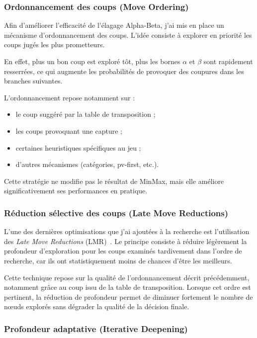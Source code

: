 \documentclass[11pt,a4paper]{article}
\begin{document}
\subsubsection{Ordonnancement des coups (Move Ordering)}

Afin d'améliorer l'efficacité de l'élagage Alpha-Beta, j'ai mis en place un mécanisme d'ordonnancement des coups. L'idée consiste
à explorer en priorité les coups jugés les plus prometteurs.

En effet, plus un bon coup est exploré tôt, plus les bornes $\alpha$ et $\beta$ sont rapidement resserrées, ce qui augmente
les probabilités de provoquer des coupures dans les branches suivantes.

L'ordonnancement repose notamment sur :

\begin{itemize}
  \item le coup suggéré par la table de transposition ;
  \item les coups provoquant une capture ;
  \item certaines heuristiques spécifiques au jeu ;
  \item d'autres mécanismes (catégories, pv-first, etc.).
\end{itemize}

Cette stratégie ne modifie pas le résultat de MinMax, mais elle améliore significativement ses performances en pratique.

\subsubsection{Réduction sélective des coups (Late Move Reductions)}

L'une des dernières optimisations que j'ai ajoutées à la recherche est l'utilisation des \emph{Late Move Reductions} (LMR)~\cite{ChessProgrammingLMR}.
Le principe consiste à réduire légèrement la profondeur d'exploration pour les coups examinés tardivement dans l'ordre de recherche,
car ils ont statistiquement moins de chances d'être les meilleurs.

Cette technique repose sur la qualité de l'ordonnancement décrit précédemment, notamment grâce au coup issu de la table de
transposition. Lorsque cet ordre est pertinent, la réduction de profondeur permet de diminuer fortement le nombre de nœuds explorés sans
dégrader la qualité de la décision finale.

\subsubsection{Profondeur adaptative (Iterative Deepening)}
\end{document}
